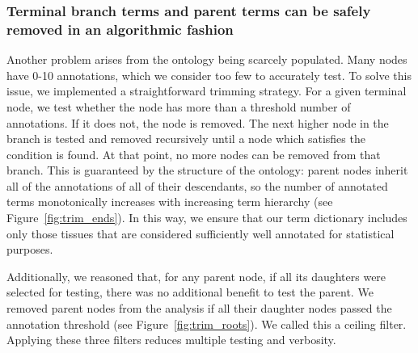 \documentclass{bmcart}
\begin{document}
\subsubsection*{Terminal branch terms and parent terms can be safely removed in an algorithmic fashion }
Another problem arises from the ontology being scarcely populated. Many nodes have 0-10 annotations, which we consider too few to accurately test. To solve this issue, we implemented a straightforward trimming strategy. For a given terminal node, we test whether the node has more than a threshold number of annotations. If it does not, the node is removed. The next higher node in the branch is tested and removed recursively until a node which satisfies the condition is found. At that point, no more nodes can be removed from that branch. This is guaranteed by the structure of the ontology: parent nodes inherit all of the annotations of all of their descendants, so the number of annotated terms monotonically increases with increasing term hierarchy (see Figure~\ref{fig:trim_ends}). In this way, we ensure that our term dictionary includes only those tissues that are considered sufficiently well annotated for statistical purposes.

Additionally, we reasoned that, for any parent node, if all its daughters were selected for testing, there was no additional benefit to test the parent. %
We removed parent nodes from the analysis if all their daughter nodes passed the annotation threshold (see Figure~\ref{fig:trim_roots}). We called this a ceiling filter. Applying these three filters reduces multiple testing and verbosity.

\end{document}
